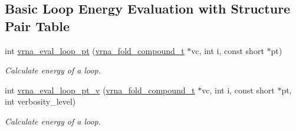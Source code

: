 \subsection*{Basic Loop Energy Evaluation with Structure Pair Table}
\begin{DoxyCompactItemize}
\item 
int \mbox{\hyperlink{group__eval_ga730ba4df55c02fd530a0cddd49faf760}{vrna\+\_\+eval\+\_\+loop\+\_\+pt}} (\mbox{\hyperlink{group__fold__compound_ga1b0cef17fd40466cef5968eaeeff6166}{vrna\+\_\+fold\+\_\+compound\+\_\+t}} $\ast$vc, int i, const short $\ast$pt)
\begin{DoxyCompactList}\small\item\em Calculate energy of a loop. \end{DoxyCompactList}\item 
int \mbox{\hyperlink{group__eval_ga30faecaff1009fe62c58312c8d56dabb}{vrna\+\_\+eval\+\_\+loop\+\_\+pt\+\_\+v}} (\mbox{\hyperlink{group__fold__compound_ga1b0cef17fd40466cef5968eaeeff6166}{vrna\+\_\+fold\+\_\+compound\+\_\+t}} $\ast$vc, int i, const short $\ast$pt, int verbosity\+\_\+level)
\begin{DoxyCompactList}\small\item\em Calculate energy of a loop. \end{DoxyCompactList}\end{DoxyCompactItemize}
